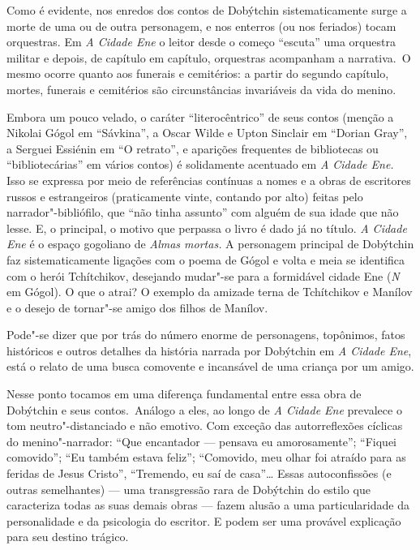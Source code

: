 Como é evidente, nos enredos dos contos de Dobýtchin sistematicamente
surge a morte de uma ou de outra personagem, e nos enterros (ou nos
feriados) tocam orquestras. Em \emph{A Cidade Ene} o leitor desde o
começo ``escuta'' uma orquestra militar e depois, de capítulo em
capítulo, orquestras acompanham a narrativa.~O mesmo ocorre quanto aos
funerais e cemitérios: a partir do segundo capítulo, mortes, funerais e
cemitérios são circunstâncias invariáveis da vida do menino.

Embora um pouco velado, o caráter ``literocêntrico'' de seus contos
(menção a Nikolai Gógol em ``Sávkina'', a Oscar Wilde e Upton Sinclair
em ``Dorian Gray'', a Serguei Essiénin em ``O retrato'', e aparições
frequentes de bibliotecas ou ``bibliotecárias'' em vários contos) é
solidamente acentuado em \emph{A Cidade Ene.} Isso se expressa por meio
de referências contínuas a nomes e a obras de escritores russos e
estrangeiros (praticamente vinte, contando por alto) feitas pelo
narrador"-bibliófilo, que ``não tinha assunto'' com alguém de sua idade
que não lesse. E, o principal, o motivo que perpassa o livro é dado já
no título. \emph{A Cidade Ene} é o espaço gogoliano de \emph{Almas
mortas.} A personagem principal de Dobýtchin faz sistematicamente
ligações com o poema de Gógol e volta e meia se identifica com o herói
Tchítchikov, desejando mudar"-se para a formidável cidade Ene (\emph{N}
em Gógol). O que o atrai? O exemplo da amizade terna de Tchítchikov e
Manílov e o desejo de tornar"-se amigo dos filhos de Manílov.

Pode"-se dizer que por trás do número enorme de personagens, topônimos,
fatos históricos e outros detalhes da história narrada por Dobýtchin em
\emph{A Cidade Ene}, está o relato de uma busca comovente e incansável de
uma criança por um amigo.

Nesse ponto tocamos em uma diferença fundamental entre essa obra de
Dobýtchin e seus contos.~Análogo a eles, ao longo de \emph{A Cidade Ene}
prevalece o tom neutro"-distanciado e não emotivo. Com exceção das
autorreflexões cíclicas do menino"-narrador: ``Que encantador --- pensava
eu amorosamente''; ``Fiquei comovido''; ``Eu também estava feliz'';
``Comovido, meu olhar foi atraído para as feridas de Jesus Cristo'',
``Tremendo, eu saí de casa''\ldots{} Essas autoconfissões (e outras
semelhantes) --- uma transgressão rara de Dobýtchin do estilo que
caracteriza todas as suas demais obras --- fazem alusão a uma
particularidade da personalidade e da psicologia do escritor. E podem
ser uma provável explicação para seu destino trágico.

